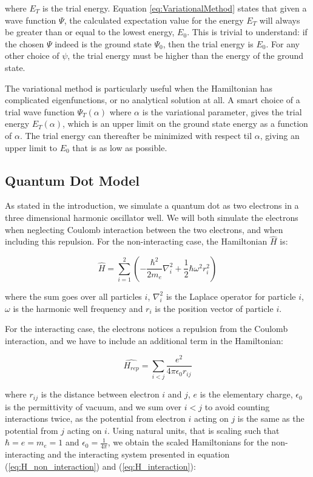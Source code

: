 \documentclass[norsk,a4paper,12pt]{article}
\begin{document}
where $E_T$ is the trial energy. 
Equation \ref{eq:VariationalMethod} states that given a wave function $\Psi$, the calculated expectation value for the energy $E_T$ will always be greater than or equal to the lowest energy, $E_0$. This is trivial to understand: if the chosen $\Psi$ indeed is the ground state $\Psi_0$, then the trial energy is $E_0$. For any other choice of $\psi$, the trial  energy must be higher than the energy of the ground state. \par 
The variational method is particularly useful when the Hamiltonian has complicated eigenfunctions, or no analytical solution at all. A smart choice of a trial wave function $\Psi_T(\alpha)$ where $\alpha$ is the variational parameter, gives the trial energy $E_T(\alpha)$, which is an upper limit on the ground state energy as a function of $\alpha$. The trial energy can thereafter be minimized with respect til $\alpha$, giving an upper limit to $E_0$ that is as low as possible.

\subsection{Quantum Dot Model}
As stated in the introduction, we simulate a quantum dot as two electrons in a three dimensional harmonic oscillator well. We will both simulate the electrons when neglecting Coulomb interaction between the two electrons, and when including this repulsion. For the non-interacting case, the Hamiltonian $\hat{H}$ is:

\begin{equation}
    \hat{H} = \sum_{i=1}^{2} (-\frac{\hbar^2}{2 m_e}\nabla_i^2 + \frac{1}{2}\hbar \omega^2r_i^2) 
    \label{eq:H_non_interaction_unit}
\end{equation}

where the sum goes over all particles $i$, $\nabla_i^2$ is the Laplace operator for particle $i$, $\omega$ is the harmonic well frequency and $r_i$ is the position vector of particle $i$. 

For the interacting case, the electrons notices a repulsion from the Coulomb interaction, and we have to include an additional term in the Hamiltonian:

\begin{equation}
    \hat{H_{rep}} = \sum_{i<j} \frac{e^2}{4\pi \epsilon_0 r_{ij}}
    \label{eq:H_interaction_unit}
\end{equation}

where $r_{ij}$ is the distance between electron $i$ and $j$, $e$ is the elementary charge, $\epsilon_ 0$ is the permittivity of vacuum, and we sum over $i < j$ to avoid counting interactions twice, as the potential from electron $i$ acting on $j$ is the same as the potential from $j$ acting on $i$. Using natural units, that is scaling such that $\hbar = e = m_e = 1$ and $\epsilon_0 = \frac{1}{4\pi}$, we obtain the scaled Hamiltonians for the non-interacting and the interacting system presented in equation (\ref{eq:H_non_interaction}) and (\ref{eq:H_interaction}):
\end{document}

